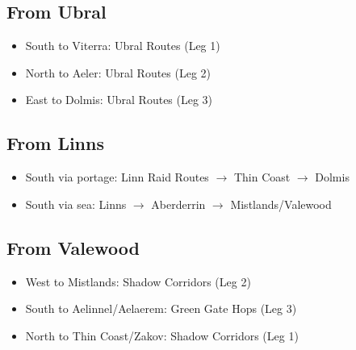 \documentclass[11pt,letterpaper,twoside]{book}
\begin{document}
\subsection{From Ubral}
\begin{itemize}
\item South to Viterra: Ubral Routes (Leg 1)
\item North to Aeler: Ubral Routes (Leg 2)
\item East to Dolmis: Ubral Routes (Leg 3)
\end{itemize}

\subsection{From Linns}
\begin{itemize}
\item South via portage: Linn Raid Routes $\rightarrow$ Thin Coast $\rightarrow$ Dolmis
\item South via sea: Linns $\rightarrow$ Aberderrin $\rightarrow$ Mistlands/Valewood
\end{itemize}

\subsection{From Valewood}
\begin{itemize}
\item West to Mistlands: Shadow Corridors (Leg 2)
\item South to Aelinnel/Aelaerem: Green Gate Hops (Leg 3)
\item North to Thin Coast/Zakov: Shadow Corridors (Leg 1)
\end{itemize}
\end{document}
